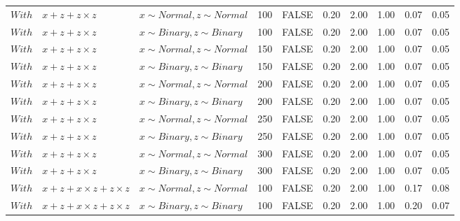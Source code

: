 \begin{longtable}{lllrlrrrrr}
  $With$ & $\textit{x} + \textit{z} + \textit{z} \times \textit{z}$ & $\textit{x} \sim Normal , \textit{z} \sim Normal$ & 100 & FALSE & 0.20 & 2.00 & 1.00 & 0.07 & 0.05 \\ 
  $With$ & $\textit{x} + \textit{z} + \textit{z} \times \textit{z}$ & $\textit{x} \sim Binary, \textit{z} \sim Binary$ & 100 & FALSE & 0.20 & 2.00 & 1.00 & 0.07 & 0.05 \\ 
  $With$ & $\textit{x} + \textit{z} + \textit{z} \times \textit{z}$ & $\textit{x} \sim Normal , \textit{z} \sim Normal$ & 150 & FALSE & 0.20 & 2.00 & 1.00 & 0.07 & 0.05 \\ 
  $With$ & $\textit{x} + \textit{z} + \textit{z} \times \textit{z}$ & $\textit{x} \sim Binary, \textit{z} \sim Binary$ & 150 & FALSE & 0.20 & 2.00 & 1.00 & 0.07 & 0.05 \\ 
  $With$ & $\textit{x} + \textit{z} + \textit{z} \times \textit{z}$ & $\textit{x} \sim Normal , \textit{z} \sim Normal$ & 200 & FALSE & 0.20 & 2.00 & 1.00 & 0.07 & 0.05 \\ 
  $With$ & $\textit{x} + \textit{z} + \textit{z} \times \textit{z}$ & $\textit{x} \sim Binary, \textit{z} \sim Binary$ & 200 & FALSE & 0.20 & 2.00 & 1.00 & 0.07 & 0.05 \\ 
  $With$ & $\textit{x} + \textit{z} + \textit{z} \times \textit{z}$ & $\textit{x} \sim Normal , \textit{z} \sim Normal$ & 250 & FALSE & 0.20 & 2.00 & 1.00 & 0.07 & 0.05 \\ 
  $With$ & $\textit{x} + \textit{z} + \textit{z} \times \textit{z}$ & $\textit{x} \sim Binary, \textit{z} \sim Binary$ & 250 & FALSE & 0.20 & 2.00 & 1.00 & 0.07 & 0.05 \\ 
  $With$ & $\textit{x} + \textit{z} + \textit{z} \times \textit{z}$ & $\textit{x} \sim Normal , \textit{z} \sim Normal$ & 300 & FALSE & 0.20 & 2.00 & 1.00 & 0.07 & 0.05 \\ 
  $With$ & $\textit{x} + \textit{z} + \textit{z} \times \textit{z}$ & $\textit{x} \sim Binary, \textit{z} \sim Binary$ & 300 & FALSE & 0.20 & 2.00 & 1.00 & 0.07 & 0.05 \\ 
  $With$ & $\textit{x} + \textit{z} + \textit{x} \times \textit{z} + \textit{z} \times \textit{z}$ & $\textit{x} \sim Normal , \textit{z} \sim Normal$ & 100 & FALSE & 0.20 & 2.00 & 1.00 & 0.17 & 0.08 \\ 
  $With$ & $\textit{x} + \textit{z} + \textit{x} \times \textit{z} + \textit{z} \times \textit{z}$ & $\textit{x} \sim Binary, \textit{z} \sim Binary$ & 100 & FALSE & 0.20 & 2.00 & 1.00 & 0.20 & 0.07 \\ 

\end{longtable}
